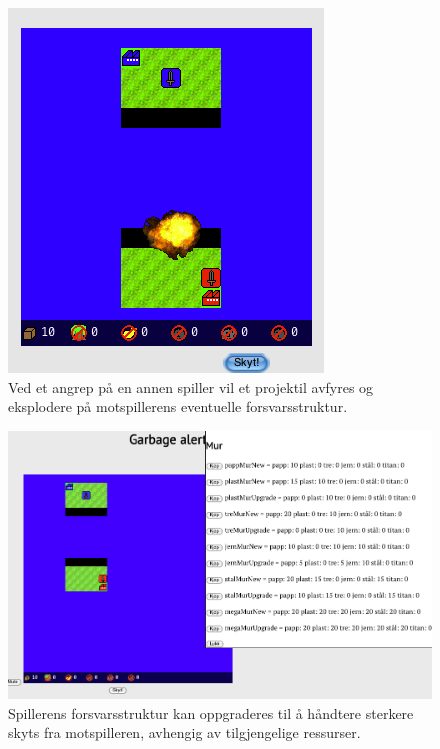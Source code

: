 \begin{figure}
\centering
\includegraphics[scale=0.5]{images/Eksplosjon.png}
\caption{Ved et angrep på en annen spiller vil et projektil avfyres og eksplodere på motspillerens eventuelle forsvarsstruktur.}
\label{fig:Eksplosjon}
\end{figure}

\begin{figure}
\centering
\includegraphics[scale=0.5]{images/OppgradereMur.png}
\caption{Spillerens forsvarsstruktur kan oppgraderes til å håndtere sterkere skyts fra motspilleren, avhengig av tilgjengelige ressurser.}
\label{fig:OppgradereMur}
\end{figure}

